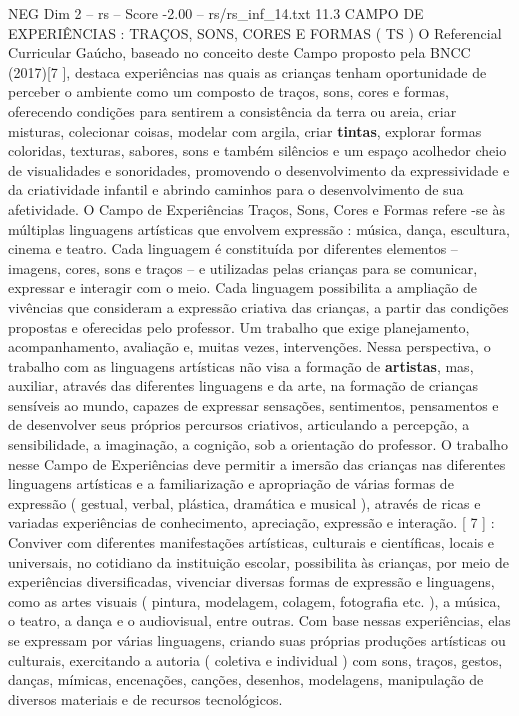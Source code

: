 \begin{textsample}{NEG Dim 2 – rs – Score -2.00 – rs/rs\_inf\_14.txt}  \label{ex:f2_neg_213}
11.3 CAMPO DE EXPERIÊNCIAS : TRAÇOS, SONS, CORES E FORMAS ( TS ) O Referencial Curricular Gaúcho, baseado no conceito deste Campo proposto pela BNCC (2017)[7 ], destaca experiências nas quais as crianças tenham oportunidade de perceber o ambiente como um composto de traços, sons, cores e formas, oferecendo condições para sentirem a consistência da terra ou areia, criar misturas, colecionar coisas, modelar com argila, criar \textbf{tintas}, explorar formas coloridas, texturas, sabores, sons e também silêncios e um espaço acolhedor cheio de visualidades e sonoridades, promovendo o desenvolvimento da expressividade e da criatividade infantil e abrindo caminhos para o desenvolvimento de sua afetividade.
O Campo de Experiências Traços, Sons, Cores e Formas refere -se às múltiplas linguagens artísticas que envolvem expressão : música, dança, escultura, cinema e teatro.
Cada linguagem é constituída por diferentes elementos – imagens, cores, sons e traços – e utilizadas pelas crianças para se comunicar, expressar e interagir com o meio.
Cada linguagem possibilita a ampliação de vivências que consideram a expressão criativa das crianças, a partir das condições propostas e oferecidas pelo professor.
Um trabalho que exige planejamento, acompanhamento, avaliação e, muitas vezes, intervenções.
Nessa perspectiva, o trabalho com as linguagens artísticas não visa a formação de \textbf{artistas}, mas, auxiliar, através das diferentes linguagens e da arte, na formação de crianças sensíveis ao mundo, capazes de expressar sensações, sentimentos, pensamentos e de desenvolver seus próprios percursos criativos, articulando a percepção, a sensibilidade, a imaginação, a cognição, sob a orientação do professor.
O trabalho nesse Campo de Experiências deve permitir a imersão das crianças nas diferentes linguagens artísticas e a familiarização e apropriação de várias formas de expressão ( gestual, verbal, plástica, dramática e musical ), através de ricas e variadas experiências de conhecimento, apreciação, expressão e interação. [ 7 ] : Conviver com diferentes manifestações artísticas, culturais e científicas, locais e universais, no cotidiano da instituição escolar, possibilita às crianças, por meio de experiências diversificadas, vivenciar diversas formas de expressão e linguagens, como as artes visuais ( pintura, modelagem, colagem, fotografia etc. ), a música, o teatro, a dança e o audiovisual, entre outras.
Com base nessas experiências, elas se expressam por várias linguagens, criando suas próprias produções artísticas ou culturais, exercitando a autoria ( coletiva e individual ) com sons, traços, gestos, danças, mímicas, encenações, canções, desenhos, modelagens, manipulação de diversos materiais e de recursos tecnológicos.

\end{textsample}
